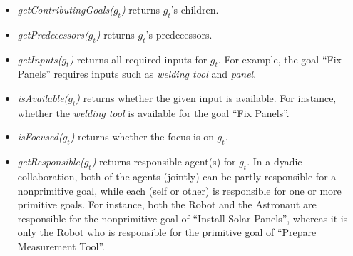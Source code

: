 \documentclass[12pt]{report}
\begin{document}
\begin{itemize}
  
  \item \textit{getContributingGoals($g_t$)} returns $g_t$'s children.
  
  \item \textit{getPredecessors($g_t$)} returns $g_t$'s predecessors.
  
  \item \textit{getInputs($g_t$)} returns all required inputs for $g_t$. For
  example, the goal ``Fix Panels'' requires inputs such as \textit{welding tool}
  and \textit{panel}.
  
  \item \textit{isAvailable($g_t$)} returns whether the given input is
  available. For instance, whether the \textit{welding tool} is available for the
  goal ``Fix Panels''.
  
  
  \item \textit{isFocused($g_t$)} returns whether the focus is on $g_t$.
  
  \item \textit{getResponsible($g_t$)} returns responsible agent(s) for $g_t$.
  In a dyadic collaboration, both of the agents (jointly) can be partly
  responsible for a nonprimitive goal, while each (self or other) is responsible
  for one or more primitive goals. For instance, both the Robot and the
  Astronaut are responsible for the nonprimitive goal of ``Install Solar
  Panels'', whereas it is only the Robot who is responsible for the
  primitive goal of ``Prepare Measurement Tool''.
\end{itemize}
\end{document}
